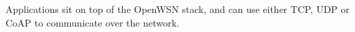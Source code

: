 Applications sit on top of the Open\+W\+SN stack, and can use either T\+CP, U\+DP or Co\+AP to communicate over the network. 